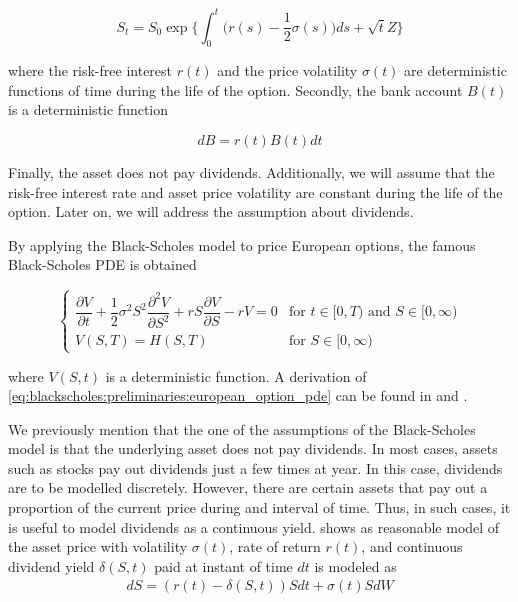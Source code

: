 {
\color{red}
\begin{equation}
  S_t = S_0 \exp\bigg\{\int_{0}^{t} \big(r(s) - \dfrac{1}{2}\sigma(s)\big)ds + \sqrt{t}Z\bigg\}
\end{equation}
}

where the risk-free interest $r(t)$ and the price volatility $\sigma(t)$ are 
deterministic functions of time during the life of the option. Secondly, the 
bank account $B(t)$ is a deterministic function

\begin{equation}
  dB = r(t)B(t)dt
\end{equation}

Finally, the asset does not pay dividends. Additionally, we will assume that 
the risk-free interest rate and asset price volatility are constant during the 
life of the option. Later on, we will address the assumption about dividends.

By applying the Black-Scholes model to price European options, the famous Black-Scholes 
PDE is obtained

\begin{equation}
  \begin{cases}
    \dfrac{\partial{V}}{\partial{t}} + \dfrac{1}{2}\sigma^{2} S^2 \dfrac{\partial^2{V}}{\partial{S^2}} + r S \dfrac{\partial{V}}{\partial{S}} - rV = 0 & \text{for $t\in[0,T)$ and $S\in[0, \infty)$} \\
    V(S, T) = H(S, T) & \text{for $S\in[0, \infty)$}
  \end{cases}
  \label{eq:blackscholes:preliminaries:european_option_pde}
\end{equation}

where $V(S, t)$ is a deterministic function. A derivation of
\eqref{eq:blackscholes:preliminaries:european_option_pde} can be found in \cite{seydel_2009}
and \cite{wilmott_howison_dewynne_1995}.

We previously mention that the one of the assumptions of the Black-Scholes model is
that the underlying asset does not pay dividends. In most cases, assets such as stocks
pay out dividends just a few times at year. In this case, dividends are to be 
modelled discretely. However, there are certain assets that pay out a proportion
of the current price during and interval of time. Thus, in such cases, it is
useful to model dividends as a continuous yield. \cite{wilmott_howison_dewynne_1995}
shows as reasonable model of the asset price with volatility $\sigma(t)$, 
rate of return $r(t)$, and continuous dividend yield $\delta(S,t)$ paid at instant
of time $dt$ is modeled as
\begin{align}
  dS = (r(t) - \delta(S, t))Sdt + \sigma(t) S dW
  \label{eq:blackscholes:preliminaries:bs_price_model_with_dividends}
\end{align}

